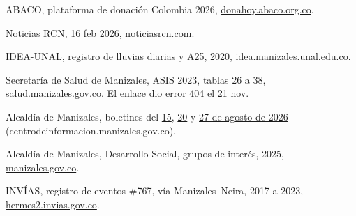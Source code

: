 \documentclass[11pt,letterpaper,parskip=half-]{scrartcl}
\begin{document}
{\begin{multicols}{2}
\begin{enumerate}[label={[\arabic*]}, ref={\arabic*}, leftmargin=2.2em, itemsep=0pt]
\item\label{f:donahoy} ABACO, plataforma de donación Colombia 2026, \href{https://donahoy.abaco.org.co/colombia2026}{donahoy.abaco.org.co}.
\item\label{f:lluvia} Noticias RCN, 16 feb 2026, \href{https://www.noticiasrcn.com/colombia/declaran-alerta-amarilla-en-manizales-por-lluvias-extremas-992470}{noticiasrcn.com}.
\item\label{f:a25} IDEA-UNAL, registro de lluvias diarias y A25, 2020, \href{https://idea.manizales.unal.edu.co/publicaciones/reportes_meteorologicos/red_manizales/niveles_de_alerta/reportes2020/SAT%20Deslizamientos-Registro%20lluvias%20diarias%20y%20A25%202020.pdf}{idea.manizales.unal.edu.co}.
\item\label{f:asis} Secretaría de Salud de Manizales, ASIS 2023, tablas 26 a 38, \href{https://salud.manizales.gov.co/wp-content/uploads/2024/07/ASIS_MANIZALES_2023.pdf}{salud.manizales.gov.co}. El enlace dio error 404 el 21 nov.
\item\label{f:alcnorte} Alcaldía de Manizales, boletines del \href{https://centrodeinformacion.manizales.gov.co/manizales-continua-con-la-evaluacion-de-viviendas-y-prepara-el-plan-de-retorno-tras-el-sismo/}{15}, \href{https://centrodeinformacion.manizales.gov.co/alcaldia-de-manizales-y-programa-mundial-de-alimentos-recorren-la-zona-rural-para-identificar-afectaciones-tras-el-sismo/}{20} y \href{https://centrodeinformacion.manizales.gov.co/alcaldia-de-manizales-acompana-a-familias-afectadas-por-el-sismo-en-pueblo-hondo/}{27 de agosto de 2026} (centrodeinformacion.manizales.gov.co).
\item\label{f:grupos} Alcaldía de Manizales, Desarrollo Social, grupos de interés, 2025, \href{https://manizales.gov.co/wp-content/uploads/2025/08/GRUPOS-DE-INTERES.pdf}{manizales.gov.co}.
\item\label{f:invias} INVÍAS, registro de eventos \#767, vía Manizales–Neira, 2017 a 2023, \href{https://hermes2.invias.gov.co/server/rest/services/N_767/Consulta767/FeatureServer/0/query?where=objectid%20IN%20%28285482,449685,1363400,1799896,3680182%29&outFields=*&f=json}{hermes2.invias.gov.co}.
\end{enumerate}
\end{multicols}
}
\end{document}

